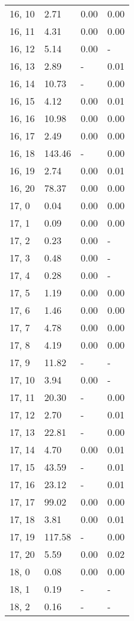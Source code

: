 \begin{table}
\begin{tabular}{llll}
16, 10 &    2.71 &  0.00 &  0.00 \\
16, 11 &    4.31 &  0.00 &  0.00 \\
16, 12 &    5.14 &  0.00 &     - \\
16, 13 &    2.89 &     - &  0.01 \\
16, 14 &   10.73 &     - &  0.00 \\
16, 15 &    4.12 &  0.00 &  0.01 \\
16, 16 &   10.98 &  0.00 &  0.00 \\
16, 17 &    2.49 &  0.00 &  0.00 \\
16, 18 &  143.46 &     - &  0.00 \\
16, 19 &    2.74 &  0.00 &  0.01 \\
16, 20 &   78.37 &  0.00 &  0.00 \\
17, 0  &    0.04 &  0.00 &  0.00 \\
17, 1  &    0.09 &  0.00 &  0.00 \\
17, 2  &    0.23 &  0.00 &     - \\
17, 3  &    0.48 &  0.00 &     - \\
17, 4  &    0.28 &  0.00 &     - \\
17, 5  &    1.19 &  0.00 &  0.00 \\
17, 6  &    1.46 &  0.00 &  0.00 \\
17, 7  &    4.78 &  0.00 &  0.00 \\
17, 8  &    4.19 &  0.00 &  0.00 \\
17, 9  &   11.82 &     - &     - \\
17, 10 &    3.94 &  0.00 &     - \\
17, 11 &   20.30 &     - &  0.00 \\
17, 12 &    2.70 &     - &  0.01 \\
17, 13 &   22.81 &     - &  0.00 \\
17, 14 &    4.70 &  0.00 &  0.01 \\
17, 15 &   43.59 &     - &  0.01 \\
17, 16 &   23.12 &     - &  0.01 \\
17, 17 &   99.02 &  0.00 &  0.00 \\
17, 18 &    3.81 &  0.00 &  0.01 \\
17, 19 &  117.58 &     - &  0.00 \\
17, 20 &    5.59 &  0.00 &  0.02 \\
18, 0  &    0.08 &  0.00 &  0.00 \\
18, 1  &    0.19 &     - &     - \\
18, 2  &    0.16 &     - &     - \\

\end{tabular}
\end{table}
